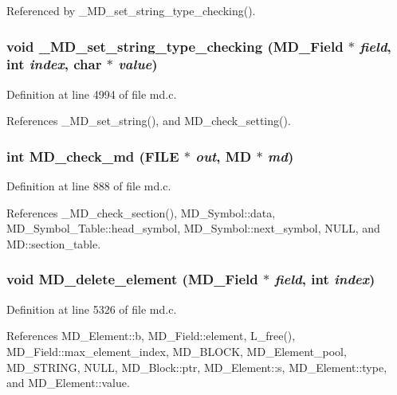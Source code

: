 Referenced by \_\-MD\_\-set\_\-string\_\-type\_\-checking().
\subsubsection{\setlength{\rightskip}{0pt plus 5cm}void \_\-MD\_\-set\_\-string\_\-type\_\-checking (\bf{MD\_\-Field} $\ast$ {\em field}, int {\em index}, char $\ast$ {\em value})}\label{md_8h_13db3b075bd2cebd2d5bac2f3ad51216}




Definition at line 4994 of file md.c.

References \_\-MD\_\-set\_\-string(), and MD\_\-check\_\-setting().
\subsubsection{\setlength{\rightskip}{0pt plus 5cm}int MD\_\-check\_\-md (FILE $\ast$ {\em out}, \bf{MD} $\ast$ {\em md})}\label{md_8h_c8488b1c9a90e9b52187a89338183b2c}




Definition at line 888 of file md.c.

References \_\-MD\_\-check\_\-section(), MD\_\-Symbol::data, MD\_\-Symbol\_\-Table::head\_\-symbol, MD\_\-Symbol::next\_\-symbol, NULL, and MD::section\_\-table.
\subsubsection{\setlength{\rightskip}{0pt plus 5cm}void MD\_\-delete\_\-element (\bf{MD\_\-Field} $\ast$ {\em field}, int {\em index})}\label{md_8h_323c95e323e8e32f489e998a83f87c53}




Definition at line 5326 of file md.c.

References MD\_\-Element::b, MD\_\-Field::element, L\_\-free(), MD\_\-Field::max\_\-element\_\-index, MD\_\-BLOCK, MD\_\-Element\_\-pool, MD\_\-STRING, NULL, MD\_\-Block::ptr, MD\_\-Element::s, MD\_\-Element::type, and MD\_\-Element::value.
